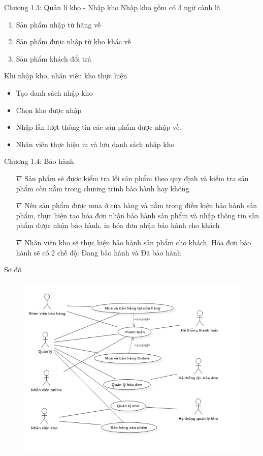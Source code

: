 \documentclass{beamer}
\begin{document}
\begin{frame}{Chương 1.3: Quản lí kho - Nhập kho}
    Nhập kho gồm có 3 ngữ cảnh là 
    \begin{enumerate}
        \item Sản phẩm nhập từ hãng về
        \item Sản phẩm được nhập từ kho khác về
        \item Sản phẩm khách đổi trả
    \end{enumerate}
    Khi nhập kho, nhân viên kho thực hiện
    \begin{itemize}
        \item Tạo danh sách nhập kho 
        \item Chọn kho được nhập
        \item Nhập lần lượt thông tin các sản phẩm được nhập về. 
        \item Nhân viên thực hiện in và lưu danh sách nhập kho
    \end{itemize}
\end{frame}
\begin{frame}{Chương 1.4: Bảo hành}
    \begin{itemize}
        \item [$\nabla$]Sản phẩm sẽ được kiểm tra lỗi sản phẩm theo quy định và kiểm tra sản phẩm còn nằm trong chương trình bảo hành hay không 
     
    \item [$\nabla$] Nếu sản phẩm được mua ở cửa hàng và nằm trong điều kiện bảo hành sản phẩm, thực hiện tạo hóa đơn nhận bảo hành sản phẩm và nhập thông tin sản phẩm được nhận bảo hành, in hóa đơn nhận bảo hành cho khách
     
    \item [$\nabla$] Nhân viên kho sẽ thực hiện bảo hành sản phẩm cho khách. Hóa đơn bảo hành sẽ có 2 chế độ: Đang bảo hành và Đã bảo hành
    \end{itemize}
\end{frame}
\begin{frame}{Sơ đồ}
    \begin{figure}[htp]
        \centering
        \includegraphics[scale = 0.7]{3.png}
    \end{figure}
\end{frame}
\end{document}
